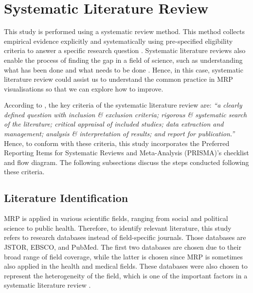 \documentclass{monashthesis}
\begin{document}
\hypertarget{ch:syslitrev}{%
\chapter{Systematic Literature Review}\label{ch:syslitrev}}

This study is performed using a systematic review method. This method collects empirical evidence explicitly and systematically using pre-specified eligibility criteria to answer a specific research question \autocite{cochrane}. Systematic literature reviews also enable the process of finding the gap in a field of science, such as understanding what has been done and what needs to be done \autocite{LinnenlueckeMartinaK2020Cslr}. Hence, in this case, systematic literature review could assist us to understand the common practice in MRP visualisations so that we can explore how to improve.

According to \textcite{brown_uni}, the key criteria of the systematic literature review are: \emph{``a clearly defined question with inclusion \& exclusion criteria; rigorous \& systematic search of the literature; critical appraisal of included studies; data extraction and management; analysis \& interpretation of results; and report for publication.''} Hence, to conform with these criteria, this study incorporates the Preferred Reporting Items for Systematic Reviews and Meta-Analysis (PRISMA)'s checklist and flow diagram. The following subsections discuss the steps conducted following these criteria.

\hypertarget{literature-identification}{%
\section{Literature Identification}\label{literature-identification}}

MRP is applied in various scientific fields, ranging from social and political science to public health. Therefore, to identify relevant literature, this study refers to research databases instead of field-specific journals. Those databases are JSTOR, EBSCO, and PubMed. The first two databases are chosen due to their broad range of field coverage, while the latter is chosen since MRP is sometimes also applied in the health and medical fields. These databases were also chosen to represent the heterogeneity of the field, which is one of the important factors in a systematic literature review \autocite{SchweizerMarinL2017Apgt}.
\end{document}
